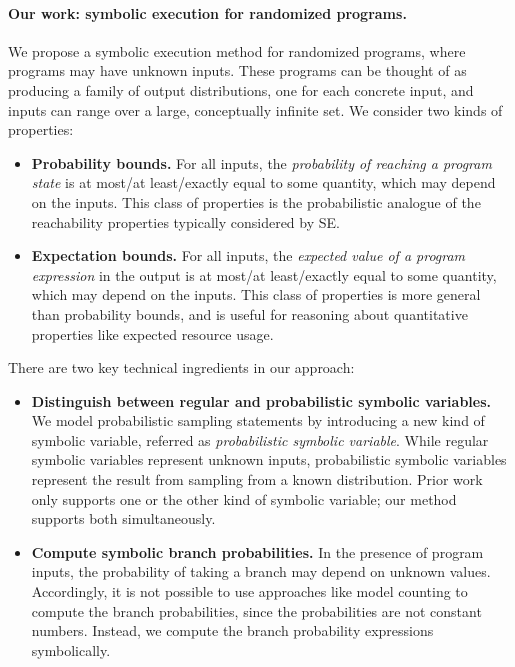 \documentclass[acmsmall,review,anonymous]{acmart}\settopmatter{printfolios=true,printccs=false,printacmref=false}
\begin{document}
\paragraph*{Our work: symbolic execution for randomized programs.}
We propose a symbolic execution method for randomized programs, where programs
may have unknown inputs. These programs can be thought of as producing a family
of output distributions, one for each concrete input, and inputs can range over
a large, conceptually infinite set. We consider two kinds of properties:
% 
\begin{itemize}
\item \textbf{Probability bounds.} For all inputs, the \emph{probability of
    reaching a program state} is at most/at least/exactly equal to some
  quantity, which may depend on the inputs. This class of properties is the
  probabilistic analogue of the reachability properties typically considered
  by SE.
\item \textbf{Expectation bounds.} For all inputs, the \emph{expected value of
    a program expression} in the output is at most/at least/exactly equal to
  some quantity, which may depend on the inputs. This class of properties is
  more general than probability bounds, and is useful for reasoning about
  quantitative properties like expected resource usage.
\end{itemize}
% 
There are two key technical ingredients in our approach:
% 
\begin{itemize}
\item \textbf{Distinguish between regular and probabilistic symbolic
    variables.} We model probabilistic sampling statements by introducing a new kind of symbolic variable, referred as \textit{probabilistic symbolic variable}. While regular symbolic variables represent unknown inputs, 
  probabilistic symbolic variables represent the result from sampling from a
  known distribution. Prior work only supports one or the other kind of
  symbolic variable; our method supports both simultaneously.
\item \textbf{Compute symbolic branch probabilities.} In the presence of
  program inputs, the probability of taking a branch may depend on unknown
  values. Accordingly, it is not possible to use approaches like model
  counting to compute the branch probabilities, since the probabilities are
  not constant numbers. Instead, we compute the branch probability expressions
  symbolically.
\end{itemize}
\end{document}
